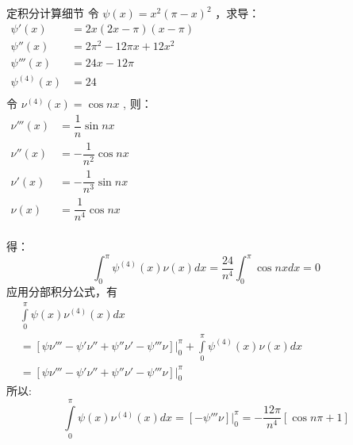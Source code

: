 \begin{frame}
	\begin{alertblock}{定积分计算细节}
		令 $\psi (x) = x^2 (\pi-x)^2$ ，求导：\\
		$\displaystyle \begin{array}{lllllllll}
			\psi ' (x) &=  2x(2x - \pi )(x - \pi ) \\
			\psi '' (x) &=  2\pi ^2 -12\pi x+12x^2 \\
			\psi ''' (x) &=  24x -12 \pi \\
			\psi^{(4)} (x) &=  24  \\
		\end{array}$ \\ 
		令 $\nu^{(4)} (x) = \cos nx$ , 则：\\
		$\displaystyle \begin{array}{lllllllll}
			\nu ''' (x) &= \dfrac{1}{n} \sin nx \\
			\nu '' (x) &= -\dfrac{1}{n^2} \cos nx \\
			\nu ' (x) &= -\dfrac{1}{n^3} \sin nx \\
			\nu (x) &= \dfrac{1}{n^4} \cos nx \\
		\end{array}$ \\ 
	\end{alertblock}
\end{frame}	

\begin{frame}
	得：
	\begin{equation*}
		\int_{0}^{\pi}  \psi^{(4)} (x)  \nu (x)  dx = \frac{24}{n^4} \int_{0}^{\pi}  \cos nx dx =0
	\end{equation*}
	应用分部积分公式，有 \\
	$\displaystyle \begin{array}{lllllllll}
		&\int\limits_{0}^{\pi}  \psi (x) \nu^{(4)} (x)  dx \\
		&= [ \psi \nu''' - \psi' \nu'' + \psi'' \nu' -\psi''' \nu ]|_0 ^\pi +	\int\limits_{0}^{\pi}  \psi^{(4)} (x)  \nu (x)  dx  \\
		&=  [ \psi \nu''' - \psi' \nu'' + \psi'' \nu' -\psi''' \nu ]|_0 ^\pi 
	\end{array}$ \\ 
	所以:
	\begin{equation*}
		\int\limits_{0}^{\pi}  \psi (x) \nu^{(4)} (x)  dx = [-\psi''' \nu ]|_0 ^\pi =  -\dfrac{12 \pi}{n^4}  [\cos n\pi +1 ]
	\end{equation*}
\end{frame}	

